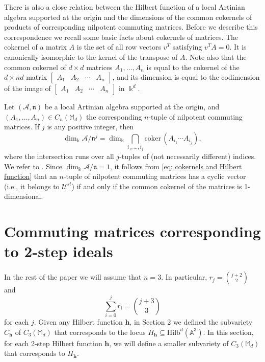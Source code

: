 \documentclass[11pt]{amsart}
\theoremstyle{definition}
\newcommand{\kk}{\Bbbk}
\newcommand{\A}{\mathbb{A}}
\newcommand{\Hilb}[2]{\mathrm{Hilb}^{#1}(\A^{#2})}
\newcommand{\h}{\mathbf{h}}
\newcommand{\ComMat}[2]{C_{#1}(\mathbb{M}_{#2})}
\newcommand{\cA}{\mathcal{A}}
\begin{document}
There is also a close relation between the Hilbert function of a local Artinian algebra supported at the origin and the dimensions of the common cokernels of products of corresponding nilpotent commuting matrices. Before we describe this correspondence we recall some basic facts about cokernels of matrices. The cokernel of a matrix $A$ is the set of all  row vectors $v^T$ satisfying $v^TA=0$. It is canonically isomorphic to the kernel of the transpose of $A$. Note also that the common cokernel of $d\times d$ matrices $A_1,\ldots ,A_n$ is equal to the cokernel of the $d\times nd$ matrix $\begin{bmatrix}A_1 & A_2 & \cdots & A_n\end{bmatrix}$, and its dimension is equal to the codimension of the image of $\begin{bmatrix}A_1 & A_2 & \cdots & A_n\end{bmatrix}$ in $\Bbbk^d$.

Let $(\cA,\mathfrak{n})$ be a local Artinian algebra supported at the origin, and $(A_1,\ldots ,A_n)\in \ComMat{n}{d}$ the corresponding $n$-tuple of nilpotent commuting matrices. If $j$ is any positive integer, then
\begin{equation}\label{eq: cokernels and Hilbert function}
\dim_{\kk}\cA/\mathfrak{n}^j=\dim_{\kk}\bigcap_{i_1,\ldots ,i_j}\mathrm{coker}\, (A_{i_1}\cdots A_{i_j}),
\end{equation}
where the intersection runs over all $j$-tuples of (not necessarily different) indices.  We refer to \cite[Lemma 3.19 and Equations (3.20)]{JS}. Since $\dim_\Bbbk\cA/\mathfrak{n}=1$, it follows from \eqref{eq: cokernels and Hilbert function} that an $n$-tuple of nilpotent commuting  matrices has a cyclic vector (i.e., it belongs to $\mathcal{U}^{st}$) if and only if the common cokernel of the matrices is 1-dimensional.



\section{Commuting matrices corresponding to 2-step ideals}

In the rest of the paper we will assume that $n=3$. In particular, $r_j={j+2\choose 2}$ and
$$\sum_{i=0}^jr_i={j+3\choose 3}$$
for each $j$. Given any Hilbert function $\h$, in Section 2 we defined the subvariety $C_\h$ of $\ComMat{3}{d}$ that corresponds to the locus $H_\h\subseteq \Hilb{d}{3}$. In this section, for each 2-step Hilbert function $\h$, we will define a smaller subvariety of $\ComMat{3}{d}$ that corresponds to $H_\h$.
\end{document}
